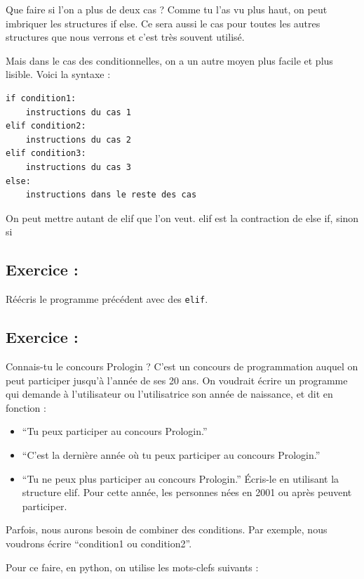 \documentclass[a4paper,french,11pt]{article}
\begin{document}
Que faire si l'on a plus de deux cas ? Comme tu l'as vu plus haut, on
peut imbriquer les structures if else. Ce sera aussi le cas pour toutes
les autres structures que nous verrons et c'est très souvent utilisé.

Mais dans le cas des conditionnelles, on a un autre moyen plus facile et
plus lisible. Voici la syntaxe :

\begin{verbatim}
if condition1:
    instructions du cas 1
elif condition2:
    instructions du cas 2
elif condition3:
    instructions du cas 3
else:
    instructions dans le reste des cas
\end{verbatim}

On peut mettre autant de elif que l'on veut. elif est la contraction de
else if, sinon si

\hypertarget{exercice-8}{%
\subsection{Exercice :}\label{exercice-8}}

Réécris le programme précédent avec des \texttt{elif}.

\hypertarget{exercice-9}{%
\subsection{Exercice :}\label{exercice-9}}

Connais-tu le concours Prologin ? C'est un concours de programmation
auquel on peut participer jusqu'à l'année de ses 20 ans. On voudrait
écrire un programme qui demande à l'utilisateur ou l'utilisatrice son
année de naissance, et dit en fonction :

\begin{itemize}
\item
  ``Tu peux participer au concours Prologin.''
\item
  ``C'est la dernière année où tu peux participer au concours
  Prologin.''
\item
  ``Tu ne peux plus participer au concours Prologin.'' Écris-le en
  utilisant la structure elif. Pour cette année, les personnes nées en
  2001 ou après peuvent participer.
\end{itemize}

Parfois, nous aurons besoin de combiner des conditions. Par exemple,
nous voudrons écrire ``condition1 ou condition2''.

Pour ce faire, en python, on utilise les mots-clefs suivants :
\end{document}
